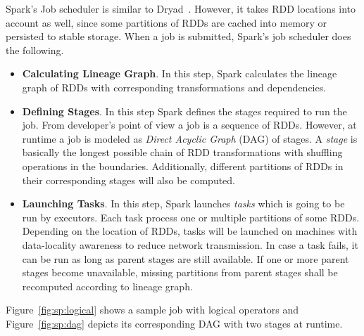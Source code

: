 Spark's Job scheduler is similar to Dryad~\cite{Isard:2007}. However, it takes RDD locations into account as well, since some partitions of RDDs are cached into memory or persisted to stable storage. When a job is submitted, Spark's job scheduler does the following.
\begin{itemize}
    \item \textbf{Calculating Lineage Graph}. In this step, Spark calculates the lineage graph of RDDs with corresponding transformations and dependencies.
    \item \textbf{Defining Stages}. In this step Spark defines the stages required to run the job. From developer's point of view a job is a sequence of RDDs. However, at runtime a job is modeled as \emph{Direct Acyclic Graph} (DAG) of stages. A \emph{stage} is basically the longest possible chain of RDD transformations with shuffling operations in the boundaries. Additionally, different partitions of RDDs in their corresponding stages will also be computed. 
    \item \textbf{Launching Tasks}. In this step, Spark launches \emph{tasks} which is going to be run by executors. Each task process one or multiple partitions of some RDDs. Depending on the location of RDDs, tasks will be launched on machines with data-locality awareness to reduce network transmission. In case a task fails, it can be run as long as parent stages are still available. If one or more parent stages become unavailable, missing partitions from parent stages shall be recomputed according to lineage graph.
\end{itemize}
Figure~\ref{fig:sp:logical} shows a sample job with logical operators and Figure~\ref{fig:sp:dag} depicts its corresponding DAG with two stages at runtime.
